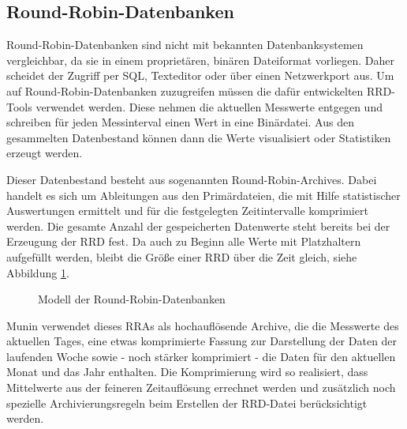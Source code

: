 \subsection{Round-Robin-Datenbanken}
Round-Robin-Datenbanken sind nicht mit bekannten Datenbanksystemen vergleichbar, da sie in einem proprietären, binären Dateiformat vorliegen.
Daher scheidet der Zugriff per SQL, Texteditor oder über einen Netzwerkport aus.
Um auf Round-Robin-Datenbanken zuzugreifen müssen die dafür entwickelten RRD-Tools verwendet werden.
Diese nehmen die aktuellen Messwerte entgegen und schreiben für jeden Messinterval einen Wert in eine Binärdatei.
Aus den gesammelten Datenbestand können dann die Werte visualisiert oder Statistiken erzeugt werden.

Dieser Datenbestand besteht aus sogenannten Round-Robin-Archives.
Dabei handelt es sich um Ableitungen aus den Primärdateien, die mit Hilfe statistischer Auswertungen ermittelt und für die festgelegten Zeitintervalle komprimiert werden.
Die gesamte Anzahl der gespeicherten Datenwerte steht bereits bei der Erzeugung der RRD fest.
Da auch zu Beginn alle Werte mit Platzhaltern aufgefüllt werden, bleibt die Größe einer RRD über die Zeit gleich, siehe Abbildung \ref{rrd-munin}.

\begin{figure}[ht]
	\centering
		\caption{Modell der Round-Robin-Datenbanken}
		\label{rrd-munin}
\end{figure}

Munin verwendet dieses RRAs als hochauflösende Archive, die die Messwerte des aktuellen Tages, eine etwas komprimierte Fassung zur Darstellung der Daten der laufenden Woche sowie - noch stärker komprimiert - die Daten für den aktuellen Monat und das Jahr enthalten.
Die Komprimierung wird so realisiert, dass Mittelwerte aus der feineren Zeitauflösung errechnet werden und zusätzlich noch spezielle Archivierungsregeln beim Erstellen der RRD-Datei berücksichtigt werden.

